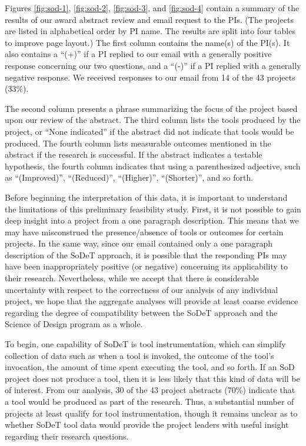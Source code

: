 Figures \ref{fig:sod-1}, \ref{fig:sod-2}, \ref{fig:sod-3}, and
\ref{fig:sod-4} contain a summary of the results of our award abstract
review and email request to the PIs. (The projects are listed in
alphabetical order by PI name. The results are split into four tables
to improve page layout.)  The first column contains the name(s) of
the PI(s).  It also contains a ``(+)'' if a PI replied to our email with a
generally positive response concerning our two questions, and a ``(-)'' if
a PI replied with a generally negative response.  We received responses
to our email from 14 of the 43 projects (33\%).

The second column presents a phrase summarizing the focus of the project
based upon our review of the abstract.  The third column lists the tools
produced by the project, or ``None indicated'' if the abstract did not
indicate that tools would be produced.  The fourth column lists measurable
outcomes mentioned in the abstract if the research is successful.  If the
abstract indicates a testable hypothesis, the fourth column indicates that
using a parenthesized adjective, such as ``(Improved)'', ``(Reduced)'',
``(Higher)'', ``(Shorter)'', and so forth.

Before beginning the interpretation of this data, it is important to
understand the limitations of this preliminary feasibility study.
First, it is not possible to gain deep insight into a project from a one
paragraph description.  This means that we may have misconstrued the
presence/absence of tools or outcomes for certain projects.  In the same
way, since our email contained only a one paragraph description of the
SoDeT approach, it is possible that the responding PIs may have
been inappropriately positive (or negative) concerning its applicability to
their research.  Nevertheless, while we accept that there is considerable
uncertainty with respect to the correctness of our analysis of any
individual project, we hope that the aggregate analyses will provide at
least coarse evidence regarding the degree of compatibility between the
SoDeT approach and the Science of Design program as a whole. 

To begin, one capability of SoDeT is tool instrumentation,
which can simplify collection of data such as when a tool is invoked, the
outcome of the tool's invocation, the amount of time spent executing the
tool, and so forth.  If an SoD project does not produce a tool, then it is
less likely that this kind of data will be of interest.  From our analysis,
30 of the 43 project abstracts (70\%) indicate that a tool would be
produced as part of the research.  Thus, a substantial number of projects
at least qualify for tool instrumentation, though it remains unclear as to
whether SoDeT tool data would provide the project leaders with useful
insight regarding their research questions.

